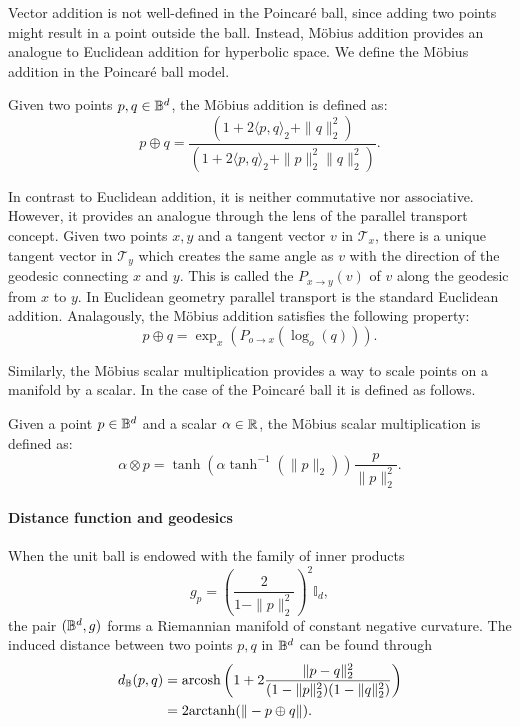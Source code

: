 Vector addition is not well-defined in the Poincaré ball, since adding two points might result in a point outside the ball. Instead, Möbius addition provides an analogue to Euclidean addition for hyperbolic space. We define the Möbius addition in the Poincaré ball model.

\begin{definition}
    Given two points $p,q\in\mathbb{B}^d$, the Möbius addition is defined as:
    \begin{equation*}
        p \oplus q = \frac{(1 +  2\langle p,q\rangle_2 + \|q\|^2_2)}{(1 + 2\langle p,q\rangle_2 + \|p\|^2_2\|q\|^2_2)}.
    \end{equation*}
    
\end{definition}

In contrast to Euclidean addition, it is neither commutative nor associative. However, it provides an analogue through the lens of the parallel transport concept. Given two points $x,y$ and a tangent vector $v$ in $\mathcal{T}_x$, there is a unique tangent vector in $\mathcal{T}_y$ which creates the same angle as $v$ with the direction of the geodesic connecting $x$ and $y$. This is called the  $P_{x\to y} (v)$ of $v$ along the geodesic from $x$ to $y$. In Euclidean geometry parallel transport is the standard Euclidean addition. Analagously, the Möbius addition satisfies the following property:
\begin{equation*}
    p\oplus q=\exp_{x}(P_{o\to x}(\log_o(q))).
\end{equation*}

Similarly, the Möbius scalar multiplication provides a way to scale points on a manifold by a scalar. In the case of the Poincaré ball it is defined as follows.

\begin{definition}
    Given a point $p\in\mathbb{B}^d$ and a scalar $\alpha\in\mathbb{R}$, the Möbius scalar multiplication is defined as:
    \begin{equation*}
        \alpha \otimes p = \tanh({\alpha \tanh^{-1}(\|p\|_2)})\frac{p}{\|p\|^2_2}.
    \end{equation*}
\end{definition}

\paragraph{Distance function and geodesics}
When the unit ball is endowed with the family of inner products
\begin{equation*}
    g_p = \left(\frac{2}{1-\|p\|^2_2}\right)^2\mathbb{I}_d,
\end{equation*}
the pair $(\mathbb{B}^d,g)$ forms a Riemannian manifold of constant negative curvature. The induced distance between two points $p,q$ in $\mathbb{B}^d$ can be found through
\begin{align}\label{eq:poincareDistance}
    d_{\mathbb{B}}(p,q) &= \text{arcosh}\left(1 + 2\frac{\|p-q\|^2_2}{(1-\|p\|^2_2)(1-\|q\|^2_2)}\right)\\
              &= 2\text{arctanh}(\|-p\oplus q\|).
\end{align}

